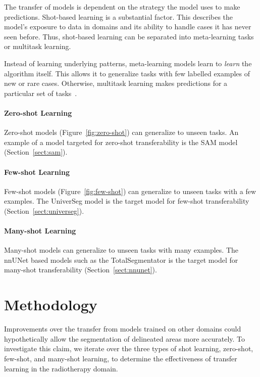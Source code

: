 \documentclass[11pt,twoside]{report}
\begin{document}
The transfer of models is dependent on the strategy the model uses to make predictions. Shot-based learning is a substantial factor. This describes the model's exposure to data in domains and its ability to handle cases it has never seen before. Thus, shot-based learning can be separated into meta-learning tasks or multitask learning. 

Instead of learning underlying patterns, meta-learning models learn to \textit{learn} the algorithm itself. This allows it to generalize tasks with few labelled examples of new or rare cases. Otherwise, multitask learning makes predictions for a particular set of tasks~\cite{deep-learning-book}.

\subsubsection{Zero-shot Learning}\label{sect:zero-shot-learning}

Zero-shot models (Figure~\ref{fig:zero-shot}) can generalize to unseen tasks. An example of a model targeted for zero-shot transferability is the SAM model (Section~\ref{sect:sam}).

\subsubsection{Few-shot Learning}\label{sect:few-shot-learning}

Few-shot models (Figure~\ref{fig:few-shot}) can generalize to unseen tasks with a few examples. The UniverSeg model is the target model for few-shot transferability (Section~\ref{sect:universeg}).

\subsubsection{Many-shot Learning}\label{sect:many-shot-learning}

Many-shot models can generalize to unseen tasks with many examples. The nnUNet based models such as the TotalSegmentator is the target model for many-shot transferability (Section~\ref{sect:nnunet}).

\chapter{Methodology}\label{sect:methodology}

Improvements over the transfer from models trained on other domains could hypothetically allow the segmentation of delineated areas more accurately. To investigate this claim, we iterate over the three types of shot learning, zero-shot, few-shot, and many-shot learning, to determine the effectiveness of transfer learning in the radiotherapy domain.
\end{document}
